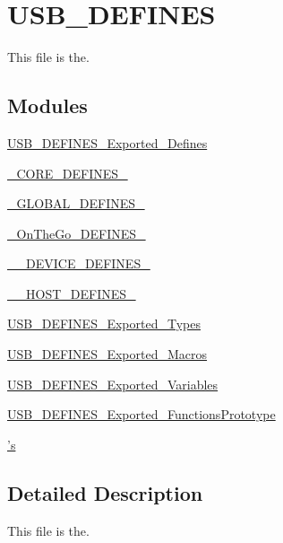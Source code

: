 \hypertarget{group___u_s_b___d_e_f_i_n_e_s}{\section{U\-S\-B\-\_\-\-D\-E\-F\-I\-N\-E\-S}
\label{group___u_s_b___d_e_f_i_n_e_s}
}


This file is the.  


\subsection*{Modules}
\begin{DoxyCompactItemize}
\item 
\hyperlink{group___u_s_b___d_e_f_i_n_e_s___exported___defines}{U\-S\-B\-\_\-\-D\-E\-F\-I\-N\-E\-S\-\_\-\-Exported\-\_\-\-Defines}
\item 
\hyperlink{group_____c_o_r_e___d_e_f_i_n_e_s__}{\-\_\-\-C\-O\-R\-E\-\_\-\-D\-E\-F\-I\-N\-E\-S\-\_\-}
\item 
\hyperlink{group_____g_l_o_b_a_l___d_e_f_i_n_e_s__}{\-\_\-\-G\-L\-O\-B\-A\-L\-\_\-\-D\-E\-F\-I\-N\-E\-S\-\_\-}
\item 
\hyperlink{group_____on_the_go___d_e_f_i_n_e_s__}{\-\_\-\-On\-The\-Go\-\_\-\-D\-E\-F\-I\-N\-E\-S\-\_\-}
\item 
\hyperlink{group_______d_e_v_i_c_e___d_e_f_i_n_e_s__}{\-\_\-\-\_\-\-D\-E\-V\-I\-C\-E\-\_\-\-D\-E\-F\-I\-N\-E\-S\-\_\-}
\item 
\hyperlink{group_______h_o_s_t___d_e_f_i_n_e_s__}{\-\_\-\-\_\-\-H\-O\-S\-T\-\_\-\-D\-E\-F\-I\-N\-E\-S\-\_\-}
\item 
\hyperlink{group___u_s_b___d_e_f_i_n_e_s___exported___types}{U\-S\-B\-\_\-\-D\-E\-F\-I\-N\-E\-S\-\_\-\-Exported\-\_\-\-Types}
\item 
\hyperlink{group___u_s_b___d_e_f_i_n_e_s___exported___macros}{U\-S\-B\-\_\-\-D\-E\-F\-I\-N\-E\-S\-\_\-\-Exported\-\_\-\-Macros}
\item 
\hyperlink{group___u_s_b___d_e_f_i_n_e_s___exported___variables}{U\-S\-B\-\_\-\-D\-E\-F\-I\-N\-E\-S\-\_\-\-Exported\-\_\-\-Variables}
\item 
\hyperlink{group___u_s_b___d_e_f_i_n_e_s___exported___functions_prototype}{U\-S\-B\-\_\-\-D\-E\-F\-I\-N\-E\-S\-\_\-\-Exported\-\_\-\-Functions\-Prototype}
\item 
\hyperlink{group___internal___macro}{'s}
\end{DoxyCompactItemize}


\subsection{Detailed Description}
This file is the. 
